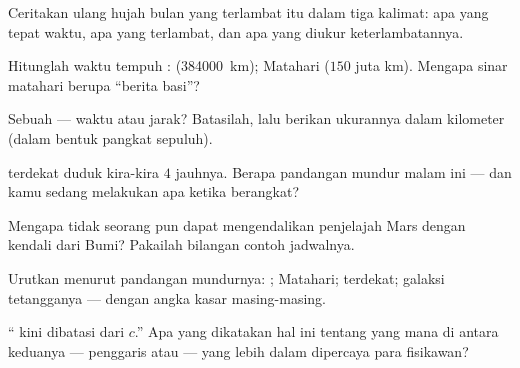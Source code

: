 \begin{exercise}[$\star$]\label{exo:g8:speed-of-light:2}
Ceritakan ulang hujah bulan yang terlambat itu dalam tiga kalimat: apa
yang tepat waktu, apa yang terlambat, dan apa yang diukur
keterlambatannya.
\end{exercise}

\begin{exercise}[$\star$]\label{exo:g8:speed-of-light:3}
Hitunglah waktu tempuh :  (\qty{384000}{km}); Matahari
($150$ juta km). Mengapa sinar matahari berupa ``berita basi''?
\end{exercise}

\begin{exercise}[$\star$]\label{exo:g8:speed-of-light:4}
Sebuah  --- waktu atau jarak? Batasilah, lalu berikan
ukurannya dalam kilometer (dalam bentuk pangkat sepuluh).
\end{exercise}

\begin{exercise}[$\star$]\label{exo:g8:speed-of-light:5}
 terdekat duduk kira-kira $4$  jauhnya. Berapa
pandangan mundur malam ini --- dan kamu sedang melakukan apa ketika
 berangkat?
\end{exercise}

\begin{exercise}[$\star$]\label{exo:g8:speed-of-light:6}
Mengapa tidak seorang pun dapat mengendalikan penjelajah Mars dengan
 kendali dari Bumi? Pakailah bilangan contoh jadwalnya.
\end{exercise}

\begin{exercise}[$\star$]\label{exo:g8:speed-of-light:7}
Urutkan menurut pandangan mundurnya: ; Matahari; 
terdekat; galaksi tetangganya --- dengan angka kasar masing-masing.
\end{exercise}

\begin{exercise}[$\star$]\label{exo:g8:speed-of-light:8}
`` kini dibatasi dari $c$.'' Apa yang dikatakan hal ini
tentang yang mana di antara keduanya --- penggaris atau  ---
yang lebih dalam dipercaya para fisikawan?
\end{exercise}

